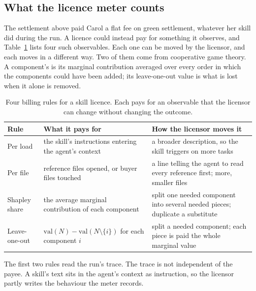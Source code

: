 \subsection{What the licence meter counts}\label{sec:he-licence-split}

The settlement above paid Carol a flat fee on green settlement, whatever her
skill did during the run. A licence could instead pay for something it
observes, and Table~\ref{tab:he-billing-rules} lists four such observables.
Each one can be moved by the licensor, and each moves in a different way. Two
of them come from cooperative game theory. A component's 
is its marginal contribution averaged over every order in which the components
could have been added; its leave-one-out value is what is lost when it alone
is removed.

\begin{table}[H]
\centering
\small
\caption{Four billing rules for a skill licence. Each pays for an observable
that the licensor can change without changing the outcome.}
\label{tab:he-billing-rules}
\begin{tabularx}{\textwidth}{@{}l >{\raggedright\arraybackslash}X >{\raggedright\arraybackslash}X@{}}
\toprule
\textbf{Rule} & \textbf{What it pays for} & \textbf{How the licensor moves it} \\
\midrule
Per load & the skill's instructions entering the agent's context & a broader description, so the skill triggers on more tasks \\
Per file & reference files opened, or buyer files touched & a line telling the agent to read every reference first; more, smaller files \\
Shapley share & the average marginal contribution of each component & split one needed component into several needed pieces; duplicate a substitute \\
Leave-one-out & $\mathrm{val}(N)-\mathrm{val}(N\setminus\{i\})$ for each component $i$ & split a needed component; each piece is paid the whole marginal value \\
\bottomrule
\end{tabularx}
\end{table}

The first two rules read the run's trace. The trace is not independent of
the payee. A skill's text sits in the agent's context as instruction, so the
licensor partly writes the behaviour the meter records.

